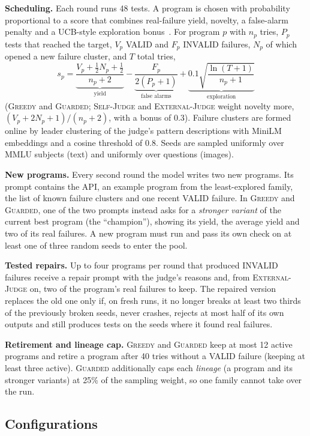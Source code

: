 \documentclass[sigconf]{acmart}
\newcommand{\SJ}{\textsc{Self-Judge}}
\newcommand{\OJ}{\textsc{External-Judge}}
\newcommand{\BOLD}{\textsc{Greedy}}
\newcommand{\BR}{\textsc{Guarded}}
\begin{document}
\textbf{Scheduling.} Each round runs 48 tests. A program is chosen with probability proportional to a score that
combines real-failure yield, novelty, a false-alarm penalty and a UCB-style exploration bonus~\cite{auer2002ucb}. For
program $p$ with $n_p$ tries, $P_p$ tests that reached the target, $V_p$ VALID and $F_p$ INVALID failures, $N_p$ of
which opened a new failure cluster, and $T$ total tries,
\[
s_p=\underbrace{\frac{V_p+\tfrac12 N_p+\tfrac12}{n_p+2}}_{\text{yield}}
   -\underbrace{\frac{F_p}{2(P_p+1)}}_{\text{false alarms}}
   +\underbrace{0.1\sqrt{\frac{\ln(T+1)}{n_p+1}}}_{\text{exploration}}
\]
(\BOLD{} and \BR{}; \SJ{} and \OJ{} weight novelty more, $(V_p+2N_p+1)/(n_p+2)$, with a bonus of $0.3$). Failure
clusters are formed online by leader clustering of the judge's pattern descriptions with MiniLM embeddings and a cosine
threshold of 0.8. Seeds are sampled uniformly over MMLU subjects (text) and uniformly over questions (images).

\textbf{New programs.} Every second round the model writes two new programs. Its prompt contains the API, an example
program from the least-explored family, the list of known failure clusters and one recent VALID failure. In \BOLD{}
and \BR{}, one of the two prompts instead asks for a \emph{stronger variant} of the current best program (the
``champion''), showing its yield, the average yield and two of its real failures. A new program must run and pass its
own check on at least one of three random seeds to enter the pool.

\textbf{Tested repairs.} Up to four programs per round that produced INVALID failures receive a repair prompt with
the judge's reasons and, from \OJ{} on, two of the program's real failures to keep. The repaired version replaces the old
one only if, on fresh runs, it no longer breaks at least two thirds of the previously broken seeds, never crashes,
rejects at most half of its own outputs and still produces tests on the seeds where it found real failures.

\textbf{Retirement and lineage cap.} \BOLD{} and \BR{} keep at most 12 active programs and retire a program after 40
tries without a VALID failure (keeping at least three active). \BR{} additionally caps each \emph{lineage} (a program
and its stronger variants) at 25\% of the sampling weight, so one family cannot take over the run.

\subsection{Configurations}
\end{document}
